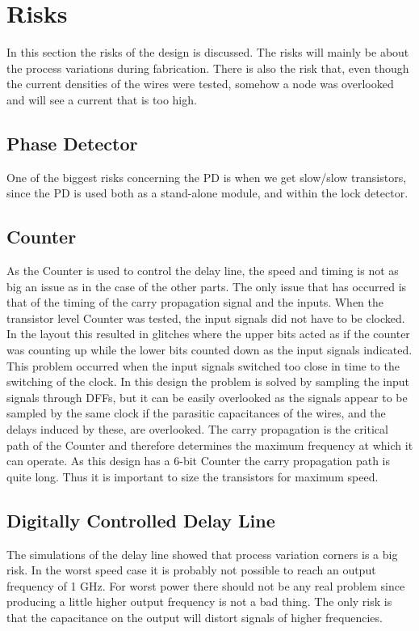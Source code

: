 \documentclass[a4paper,12pt]{article} \usepackage{graphicx}
\begin{document}
\section{Risks}
In this section the risks of the design is discussed. The risks will mainly be
about the process variations during fabrication. There is also the risk that,
even though the current densities of the wires were tested, somehow a node was
overlooked and will see a current that is too high.

\subsection{Phase Detector}
One of the biggest risks concerning the PD is when we get
slow/slow transistors, since the PD is used both as a stand-alone
module, and within the lock detector.

\subsection{Counter}
As the Counter is used to control the delay line, the speed and timing is not as
big an issue as in the case of the other parts. The only issue that has occurred
is that of the timing of the carry propagation signal and the inputs. When the
transistor level Counter was tested, the input signals did not have to be
clocked. In the layout this resulted in glitches where the upper bits acted as
if the counter was counting up while the lower bits counted down as the input
signals indicated. This problem occurred when the input signals switched too
close in time to the switching of the clock. In this design the problem is
solved by sampling the input signals through DFFs, but it can be easily
overlooked as the signals appear to be sampled by the same clock if the
parasitic capacitances of the wires, and the delays induced by these, are
overlooked. The carry propagation is the critical path of the Counter and
therefore determines the maximum frequency at which it can operate. As this
design has a 6-bit Counter the carry propagation path is quite long. Thus it is
important to size the transistors for maximum speed. 

\subsection{Digitally Controlled Delay Line}
The simulations of the delay line showed that process variation corners is a big
risk. In the worst speed case it is probably not possible to reach an output
frequency of 1 GHz. For worst power there should not be any real problem since
producing a little higher output frequency is not a bad thing. The only risk is
that the capacitance on the output will distort signals of higher frequencies.
\end{document}
